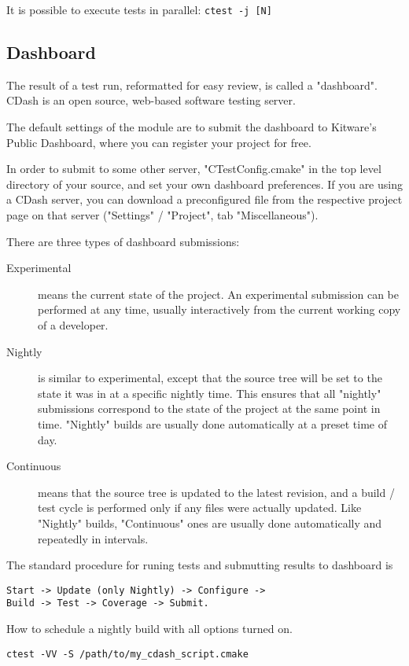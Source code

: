 \documentclass[a4paper,10pt]{article}
\begin{document}
It is possible to execute tests in parallel:
\texttt{ctest -j [N]}

\subsection{Dashboard}

The result of a test run, reformatted for easy review, is called a "dashboard". CDash is an open source, web-based software testing server.
            
The default settings of the module are to submit the dashboard to Kitware's Public Dashboard, where you can register your project for free.

In order to submit to some other server, "CTestConfig.cmake" in the top level directory of your source, and set your own dashboard preferences. If you are using a CDash server, you can download a preconfigured file from the respective project page on that server ("Settings" / "Project", tab "Miscellaneous").


There are three types of dashboard submissions:
\begin{description}
 \item[Experimental] means the current state of the project. An experimental submission can be performed at any time, usually interactively from the current working copy of a developer.
  \item[Nightly] is similar to experimental, except that the source tree will be set to the state it was in at a specific nightly time. This ensures that all "nightly" submissions correspond to the state of the project at the same point in time. "Nightly" builds are usually done automatically at a preset time of day.
 \item[Continuous] means that the source tree is updated to the latest revision, and a build / test cycle is performed only if any files were actually updated. Like "Nightly" builds, "Continuous" ones are usually done automatically and repeatedly in intervals.
\end{description}


The standard procedure for runing tests and submutting results to dashboard is
\begin{verbatim}
Start -> Update (only Nightly) -> Configure -> 
Build -> Test -> Coverage -> Submit.
\end{verbatim}


How to schedule a nightly build with all options turned on. 
\begin{verbatim}
ctest -VV -S /path/to/my_cdash_script.cmake
\end{verbatim}
\end{document}
